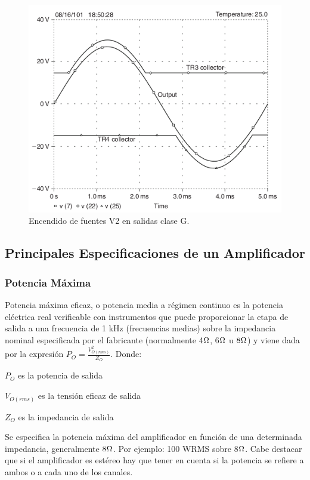 \begin{figure}[H]
 \centering
 \includegraphics[scale=0.55]{img/ampliG_salida.png}
 \caption{Encendido de fuentes V2 en salidas clase G.}
 \label{ampliG_salida} 
 \end{figure}

\subsection{Principales Especificaciones de un Amplificador}
\medskip 
\subsubsection*{Potencia Máxima}

Potencia máxima eficaz, o potencia media a régimen continuo es la potencia eléctrica real verificable con instrumentos que puede proporcionar la etapa de salida  a una frecuencia de 1 kHz (frecuencias medias) sobre la impedancia nominal especificada por el fabricante (normalmente 4$\ohm$, 6$\ohm$ u $8\ohm$) y viene dada por la expresión $P_O=  \frac{V_{O(rms)}^2}{Z_O}$. Donde:
\begin{description}
\item $P_O$ es la potencia de salida
\item $V_{O(rms)}$ es la tensión eficaz de salida
\item $Z_O$ es la impedancia de salida
\end{description}

Se especifica la potencia máxima del amplificador en función de una determinada impedancia, generalmente $8\ohm$. Por ejemplo: 100 WRMS sobre 8$\ohm$.
Cabe destacar que si el amplificador es estéreo hay que tener en cuenta si la potencia se refiere a      ambos o a cada uno de los canales.
\medskip 
